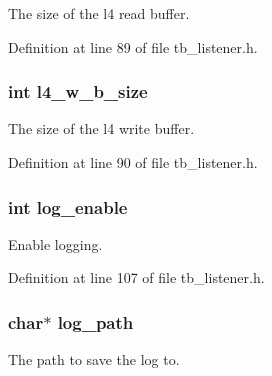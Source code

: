 The size of the l4 read buffer. 



Definition at line 89 of file tb\-\_\-listener.\-h.

\hypertarget{structtb__test__params__t_a97320ff488c6ed44b28b034c826482c7}{
\subsubsection[{l4\-\_\-w\-\_\-b\-\_\-size}]{\setlength{\rightskip}{0pt plus 5cm}int l4\-\_\-w\-\_\-b\-\_\-size}}\label{structtb__test__params__t_a97320ff488c6ed44b28b034c826482c7}


The size of the l4 write buffer. 



Definition at line 90 of file tb\-\_\-listener.\-h.

\hypertarget{structtb__test__params__t_ac5bfaec8717601161bb642175e1d85e0}{
\subsubsection[{log\-\_\-enable}]{\setlength{\rightskip}{0pt plus 5cm}int log\-\_\-enable}}\label{structtb__test__params__t_ac5bfaec8717601161bb642175e1d85e0}


Enable logging. 



Definition at line 107 of file tb\-\_\-listener.\-h.

\hypertarget{structtb__test__params__t_ac0ddb52991004ce37e7ef093186f44a1}{
\subsubsection[{log\-\_\-path}]{\setlength{\rightskip}{0pt plus 5cm}char$\ast$ log\-\_\-path}}\label{structtb__test__params__t_ac0ddb52991004ce37e7ef093186f44a1}


The path to save the log to. 




